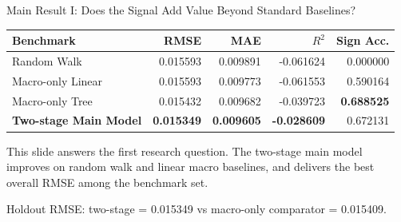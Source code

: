 \begin{frame}{Main Result I: Does the Signal Add Value Beyond Standard Baselines?}
  \footnotesize
  \begin{table}
    \centering
    \renewcommand{\arraystretch}{1.15}
    \begin{tabular}{>{\raggedright\arraybackslash}p{} r r r r}
      \toprule
      Benchmark & RMSE & MAE & $R^2$ & Sign Acc. \\
      \midrule
      Random Walk & 0.015593 & 0.009891 & -0.061624 & 0.000000 \\
      Macro-only Linear & 0.015593 & 0.009773 & -0.061553 & 0.590164 \\
      Macro-only Tree & 0.015432 & 0.009682 & -0.039723 & \textbf{0.688525} \\
      \textbf{Two-stage Main Model} & \textbf{0.015349} & \textbf{0.009605} & \textbf{-0.028609} & 0.672131 \\
      \bottomrule
    \end{tabular}
  \end{table}

  \vspace{0.4em}
  \small
  This slide answers the first research question. The two-stage main model improves on random walk and linear macro baselines, and delivers the best overall RMSE among the benchmark set.

  \tiny
  Holdout RMSE: two-stage = 0.015349 vs macro-only comparator = 0.015409.
\end{frame}
